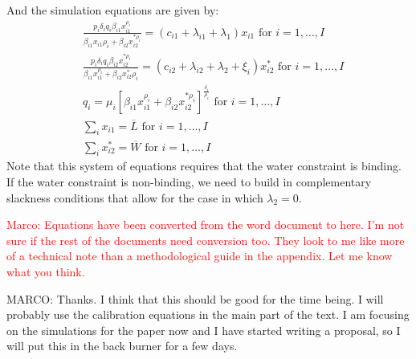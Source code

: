 \documentclass[review]{elsarticle}
\begin{document}
And the simulation equations are given by:
\begin{equation}
\begin{split}
    & \frac { p _ { i } \delta _ { i } q _ { i } \beta _ { i 1 } x _ { i 1 } ^ { \rho _ { i } } } { \beta _ { i 1 } x _ { i 1 } \rho _ { i } + \beta _ { i 2 } x _ { i 2 } ^ { * \rho _ { i } } } = \left( c _ { i 1 } + \lambda _ { i 1 } + \lambda _ { 1 } \right) x _ { i 1 } \text { for } i = 1 , \ldots , I \\
    & \frac { p _ { i } \delta _ { i } q _ { i } \beta _ { i 2 } x _ { i 2 } ^ { * \rho _ { i } } } { \beta _ { i 1 } x _ { i 1 } ^ { \rho _ { i } } + \beta _ { i 2 } x _ { i 2 } ^ { * } \rho _ { i } } = \left( c _ { i 2 } + \lambda _ { i 2 } + \lambda _ { 2 } + \xi _ { i } \right) x _ { i 2 } ^ { * } \text { for } i = 1 , \ldots , I \\
    & q _ { i } = \mu _ { i } \left[ \beta _ { i 1 } x _ { i 1 } ^ { \rho _ { i } } + \beta _ { i 2 } x _ { i 2 } ^ { * \rho _ { i } } \right] ^ { \frac { \delta _ { i } } { \rho _ { i } } } \text { for } i = 1 , \ldots , I \\
    & \sum _ { i } x _ { i 1 } = \overline { L } \text { for } i = 1 , \ldots , I \\
    & \sum _ { i } x _ { i 2 } ^ { * } = \overline { W } \text { for } i = 1 , \ldots , I
\end{split}
\end{equation}
Note that this system of equations requires that the water constraint is binding. If the water constraint is non-binding, we need to build in complementary slackness conditions that allow for the case in which $\lambda _ { 2 } = 0$.

\vspace{1in}
\large
\textcolor{red}{Marco: Equations have been converted from the word document to here. I'm not sure if the rest of the documents need conversion too. They look to me like more of a technical note than a methodological guide in the appendix. Let me know what you think.}

MARCO: Thanks. I think that this should be good for the time being. I will probably use the calibration equations in the main part of the text. I am focusing on the simulations for the paper now and I have started writing a proposal, so I will put this in the back burner for a few days. 
\end{document}
